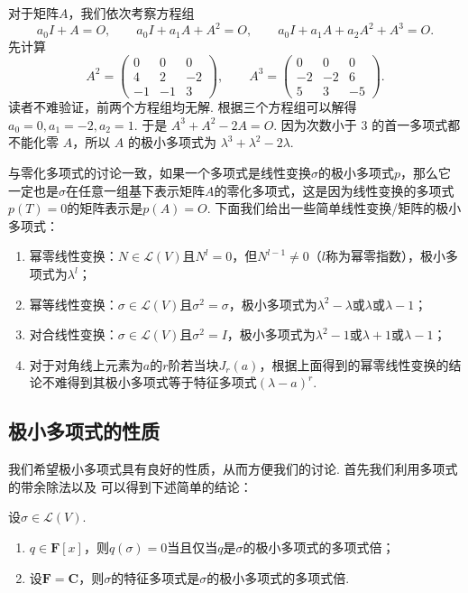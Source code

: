 \begin{solution}
    对于矩阵$A$，我们依次考察方程组
    \[
        a_0I+A=O,\qquad a_0I+a_1A+A^2=O,\qquad a_0I+a_1A+a_2A^2+A^3=O.
    \]
    先计算
    \[
        A^2=\begin{pmatrix}
                0 & 0  & 0  \\
                4 & 2  & -2 \\
                -1 & -1 & 3
            \end{pmatrix},
        \qquad
        A^3=\begin{pmatrix}
                0 & 0  & 0  \\
                -2 & -2 & 6  \\
                5 & 3  & -5
            \end{pmatrix}.
    \]
    读者不难验证，前两个方程组均无解. 根据三个方程组可以解得 $a_0 = 0, a_1 = -2, a_2 = 1$. 于是 $A^3 + A^2 - 2A=O$. 因为次数小于 $3$ 的首一多项式都不能化零 $A$，所以 $A$ 的极小多项式为 $\lambda^3+\lambda^2-2\lambda$.
\end{solution}

与零化多项式的讨论一致，如果一个多项式是线性变换$\sigma$的极小多项式$p$，那么它一定也是$\sigma$在任意一组基下表示矩阵$A$的零化多项式，这是因为线性变换的多项式$p(T)=0$的矩阵表示是$p(A)=O$. 下面我们给出一些简单线性变换/矩阵的极小多项式：
\begin{enumerate}
    \item 幂零线性变换：$N\in \mathcal{L}(V)$且$N^l=0$，但$N^{l-1}\neq 0$（$l$称为幂零指数），极小多项式为$\lambda^l$；

    \item 幂等线性变换：$\sigma\in \mathcal{L}(V)$且$\sigma^2=\sigma$，极小多项式为$\lambda^2-\lambda$或$\lambda$或$\lambda-1$；

    \item 对合线性变换：$\sigma\in \mathcal{L}(V)$且$\sigma^2=I$，极小多项式为$\lambda^2-1$或$\lambda+1$或$\lambda-1$；

    \item 对于对角线上元素为$a$的$r$阶若当块$J_r(a)$，根据上面得到的幂零线性变换的结论不难得到其极小多项式等于特征多项式$(\lambda-a)^r$.
\end{enumerate}

\subsection{极小多项式的性质}

我们希望极小多项式具有良好的性质，从而方便我们的讨论. 首先我们利用多项式的带余除法以及 可以得到下述简单的结论：
\begin{theorem}{}{}
    设$\sigma\in \mathcal{L}(V)$.
    \begin{enumerate}
        \item $q\in\mathbf{F}[x]$，则$q(\sigma)=0$当且仅当$q$是$\sigma$的极小多项式的多项式倍；

        \item 设$\mathbf{F}=\mathbf{C}$，则$\sigma$的特征多项式是$\sigma$的极小多项式的多项式倍.
    \end{enumerate}
\end{theorem}

